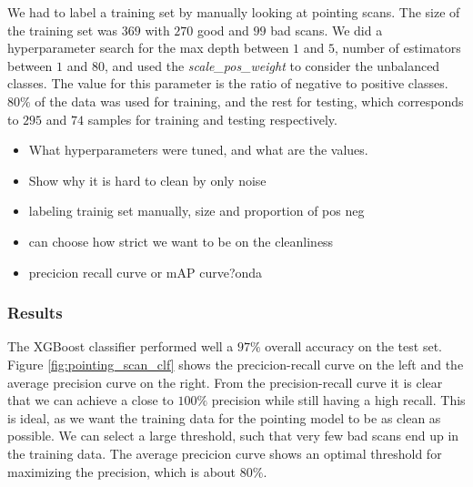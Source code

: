 We had to label a training set by manually looking at pointing scans.
The size of the training set was $369$ with $270$ good and $99$ bad scans.
We did a hyperparameter search for the max depth between $1$ and $5$, number of estimators between $1$ and $80$, 
and used the \textit{scale\_pos\_weight} to consider the unbalanced classes.
The value for this parameter is the ratio of negative to positive classes.
$80\%$ of the data was used for training, and the rest for testing, which corresponds to $295$ and $74$ samples for training and testing respectively.


\begin{itemize}
    \item What hyperparameters were tuned, and what are the values.
    \item Show why it is hard to clean by only noise
    \item labeling trainig set manually, size and proportion of pos neg
    \item can choose how strict we want to be on the cleanliness
    \item precicion recall curve or mAP curve?onda
\end{itemize}

\subsubsection{Results}
The XGBoost classifier performed well a $97\%$ overall accuracy on the test set.
Figure \ref{fig:pointing_scan_clf} shows the precicion-recall curve on the left and the average precision curve on the right.
From the precision-recall curve it is clear that we can achieve a close to $100\%$ precision while still having a high recall.
This is ideal, as we want the training data for the pointing model to be as clean as possible.
We can select a large threshold, such that very few bad scans end up in the training data.
The average precicion curve shows an optimal threshold for maximizing the precision, which is about $80\%$.

